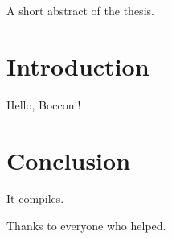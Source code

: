 \documentclass[university=bocconi, bachelor, language=english, twoside]{academicthesis}
\begin{document}
\frontpage

\frontmatter
\begin{abstractthesis}
  A short abstract of the thesis.
\end{abstractthesis}

\tableofcontents

\mainmatter
\chapter{Introduction}
Hello, Bocconi!

\chapter{Conclusion}
It compiles.

\backmatter
\begin{acknowledgements}
  Thanks to everyone who helped.
\end{acknowledgements}
\end{document}
